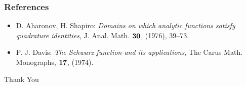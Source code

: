 \documentclass{beamer}
\begin{document}

\begin{frame}
 \frametitle{References}

\begin{itemize}

\item D. Aharonov, H. Shapiro: {\it Domains on which analytic functions satisfy quadrature identities}, J. Anal. Math. ${\bf 30}$, (1976), 39--73.

\item P. J. Davis: {\it The Schwarz function and its applications}, The Carus Math. Monographs, ${\bf 17}$, (1974).

\end{itemize}

\end{frame}

\begin{frame}

\begin{center}
 Thank You
\end{center}

\end{frame}

\end{document}
